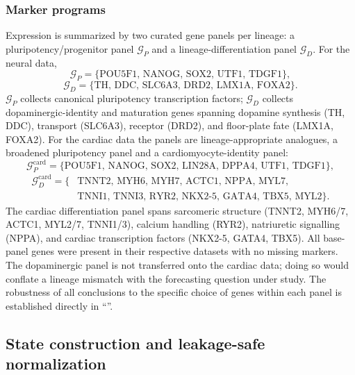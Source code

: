 \documentclass[10pt,letterpaper]{article}
\begin{document}
\subsubsection*{Marker programs}
Expression is summarized by two curated gene panels per lineage: a pluripotency/progenitor panel $\mathcal{G}_P$ and a lineage-differentiation panel $\mathcal{G}_D$. For the neural data,
\[
\mathcal{G}_P=\{\mathrm{POU5F1,\,NANOG,\,SOX2,\,UTF1,\,TDGF1}\},
\]
\[
\mathcal{G}_D=\{\mathrm{TH,\,DDC,\,SLC6A3,\,DRD2,\,LMX1A,\,FOXA2}\}.
\]
$\mathcal{G}_P$ collects canonical pluripotency transcription factors; $\mathcal{G}_D$ collects dopaminergic-identity and maturation genes spanning dopamine synthesis (\textrm{TH, DDC}), transport (\textrm{SLC6A3}), receptor (\textrm{DRD2}), and floor-plate fate (\textrm{LMX1A, FOXA2}). For the cardiac data the panels are lineage-appropriate analogues, a broadened pluripotency panel and a cardiomyocyte-identity panel:
\[
\mathcal{G}_P^{\mathrm{card}}=\{\mathrm{POU5F1,\,NANOG,\,SOX2,\,LIN28A,\,DPPA4,\,UTF1,\,TDGF1}\},
\]
\begin{align*}
\mathcal{G}_D^{\mathrm{card}}=\{&\mathrm{TNNT2,\,MYH6,\,MYH7,\,ACTC1,\,NPPA,\,MYL7,}\\
&\mathrm{TNNI1,\,TNNI3,\,RYR2,\,NKX2\text{-}5,\,GATA4,\,TBX5,\,MYL2}\}.
\end{align*}
The cardiac differentiation panel spans sarcomeric structure (\textrm{TNNT2, MYH6/7, ACTC1, MYL2/7, TNNI1/3}), calcium handling (\textrm{RYR2}), natriuretic signalling (\textrm{NPPA}), and cardiac transcription factors (\textrm{NKX2-5, GATA4, TBX5}). All base-panel genes were present in their respective datasets with no missing markers. The dopaminergic panel is not transferred onto the cardiac data; doing so would conflate a lineage mismatch with the forecasting question under study. The robustness of all conclusions to the specific choice of genes within each panel is established directly in ``''.

\subsection*{State construction and leakage-safe normalization}
\label{subsec:state}
\end{document}

